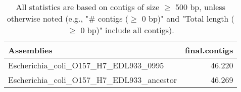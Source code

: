 \documentclass[12pt,a4paper]{article}
\begin{document}
\begin{table}[ht]
\begin{center}
\caption{All statistics are based on contigs of size $\geq$ 500 bp, unless otherwise noted (e.g., "\# contigs ($\geq$ 0 bp)" and "Total length ($\geq$ 0 bp)" include all contigs).}
\begin{tabular}{|l*{1}{|r}|}
\hline
Assemblies & final.contigs \\ \hline
Escherichia\_coli\_O157\_H7\_EDL933\_0995 & 46.220 \\ \hline
Escherichia\_coli\_O157\_H7\_EDL933\_ancestor & 46.269 \\ \hline
\end{tabular}
\end{center}
\end{table}
\end{document}
